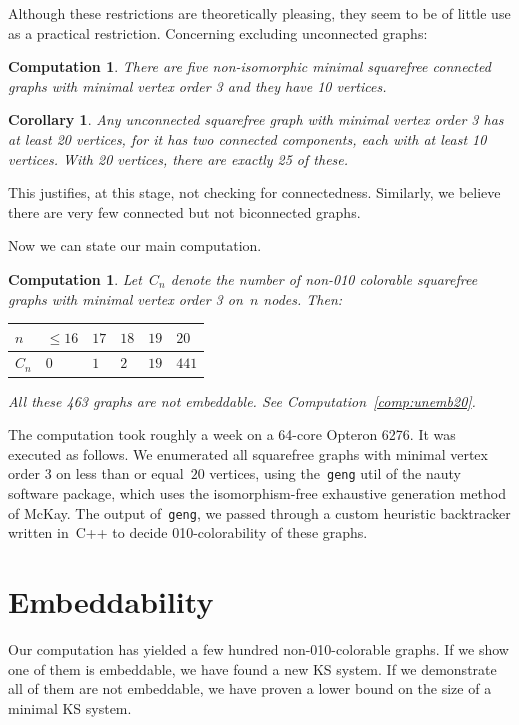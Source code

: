 \documentclass[adraft,copyright,creativecommons]{eptcs}
\newcounter{main}
\newtheorem{comp}[main]{Computation}
\newtheorem{cor}[main]{Corollary}
\theoremstyle{definition}
\theoremstyle{remark}
\begin{document}
Although these restrictions are theoretically pleasing,
they seem to be of little use as a practical restriction.
Concerning excluding unconnected graphs:
\begin{comp}
    There are five non-isomorphic minimal
    squarefree connected graphs
    with minimal vertex order 3 and they have 10 vertices.
\end{comp}
\begin{cor}
    Any unconnected
    squarefree graph with minimal vertex order 3
    has at least 20 vertices, for it has two connected components,
    each with at least 10 vertices.
    With 20 vertices, there are exactly 25 of these.
\end{cor}
This justifies, at this stage, not checking for connectedness.
Similarly, we believe there are very few connected but not biconnected graphs.

Now we can state our main computation.
\begin{comp}
    Let~$C_n$ denote the number of non-010 colorable squarefree
    graphs with minimal vertex order 3 on~$n$ nodes.  Then:

    \begin{center}
    \begin{tabular}{l|lllll}
        $n$ & $\leq 16$
            & $17$
            & $18$
            & $19$
            & $20$ \\
        \hline
        $C_n$ & $0$
            & $1$
            & $2$
            & $19$
            & $441$
    \end{tabular}
    \end{center}

    All these 463 graphs are not embeddable.
    See Computation~\ref{comp:unemb20}.
\end{comp}
The computation took roughly a week on a 64-core Opteron 6276.
It was executed as follows.
We enumerated all squarefree graphs with minimal vertex
order 3 on less than or equal~$20$ vertices,
using the~\texttt{geng} util of the nauty software package,
which uses the isomorphism-free exhaustive generation
method of McKay\cite{geng}.
The output of~\texttt{geng}, we passed through
a custom heuristic backtracker written in~C++
to decide 010-colorability of these graphs.

\section{Embeddability}
Our computation has yielded a few hundred non-010-colorable graphs.
If we show one of them is embeddable, we have found a new KS system.
If we demonstrate all of them are not embeddable, we have
proven a lower bound on the size of a minimal KS system.
\end{document}
